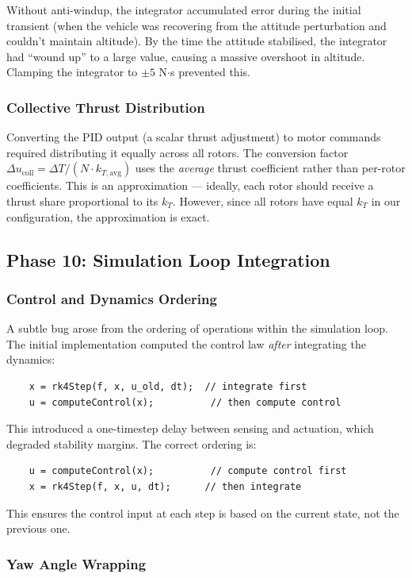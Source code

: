 \documentclass[12pt, a4paper]{article}
\begin{document}
Without anti-windup, the integrator accumulated error during the initial transient (when the vehicle was recovering from the attitude perturbation and couldn't maintain altitude).  By the time the attitude stabilised, the integrator had ``wound up'' to a large value, causing a massive overshoot in altitude.  Clamping the integrator to $\pm 5$ N$\cdot$s prevented this.

\subsubsection{Collective Thrust Distribution}

Converting the PID output (a scalar thrust adjustment) to motor commands required distributing it equally across all rotors.  The conversion factor $\Delta u_{\text{coll}} = \Delta T / (N \cdot k_{T,\text{avg}})$ uses the \emph{average} thrust coefficient rather than per-rotor coefficients.  This is an approximation --- ideally, each rotor should receive a thrust share proportional to its $k_T$.  However, since all rotors have equal $k_T$ in our configuration, the approximation is exact.

\subsection{Phase 10: Simulation Loop Integration}

\subsubsection{Control and Dynamics Ordering}

A subtle bug arose from the ordering of operations within the simulation loop.  The initial implementation computed the control law \emph{after} integrating the dynamics:
\begin{verbatim}
    x = rk4Step(f, x, u_old, dt);  // integrate first
    u = computeControl(x);          // then compute control
\end{verbatim}
This introduced a one-timestep delay between sensing and actuation, which degraded stability margins.  The correct ordering is:
\begin{verbatim}
    u = computeControl(x);          // compute control first
    x = rk4Step(f, x, u, dt);      // then integrate
\end{verbatim}
This ensures the control input at each step is based on the current state, not the previous one.

\subsubsection{Yaw Angle Wrapping}
\end{document}
